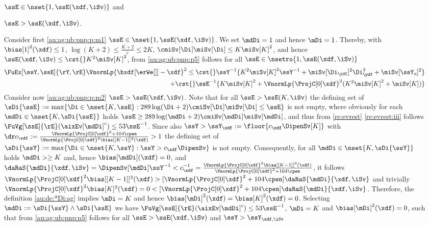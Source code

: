 \begin{pro}
\begin{inparaenum}[i]
$\ssE\in\nset{1,\ssE(\xdf,\iSv)}$ and \item\label{au:ag:ub:pnp:p:m2}
$\ssE>\ssE(\xdf,\iSv)$. \end{inparaenum}
Consider first \ref{au:ag:ub:pnp:p:m1} $\ssE\in\nset{1,\ssE(\xdf,\iSv)}$.
We set $\mdDi=1$ and hence
$\mDi=1$. Thereby, with $\bias[1]^2(\xdf)\leq1$, $\log(K+2)\leq
\tfrac{K+2}{e}\leq 2K$, $\cmiSv[\Di]\miSv[\Di]\leq K\miSv[K]^2$, and hence $\ssE(\xdf,\iSv)\leq\cst{}K^2\miSv[K]^2$,
from \eqref{au:ag:ub:pnp:p5} follows for all $\ssE\in\nsetro{1,\ssE(\xdf,\iSv)}$
\begin{multline}\label{au:ag:ub:pnp:p6}
  \FuEx[\ssY,\ssE]{\rY,\rE}\VnormLp{\hxdf[{\erWe[]}]-\xdf}^2\leq \cst{}\ssY^{-1}\{K^2\miSv[K]^2\ssY^{-1}+\miSv[\Di_{\ydf}]^2\Di_{\ydf}^3+\miSv[\ssY_{o}]^2\}\\\hfill
    +\cst{}\ssE^{-1}\{K\miSv[K]^2+ \VnormLp{\ProjC[0]\xdf}^2(K^2\miSv[K]^2+\miSv[K])\}
  \end{multline}
Consider now \ref{au:ag:ub:pnp:p:m2} $\ssE>\ssE(\xdf,\iSv)$. Note that for all $\ssE> \ssE(K,\iSv)$ the defining set of
$\sDi{\ssE}:=\max\{\Di\in\nset{K,\ssE}:289\log(\Di+2)\cmiSv[\Di]\miSv[\Di]\leq\ssE\}$
is not empty, where obviously for each
$\mdDi\in\nset{K,\sDi{\ssE}}$ holds 
$\ssE\geq289\log(\mdDi+2)\cmiSv[\mdDi]\miSv[\mdDi]$, and thus from
\cref{re:evrest} \ref{re:evrest:iii} follows
$\FuVg[\ssE]{\rE}(\aixEv[\mdDi]^c)\leq 53\ssE^{-1}$.
Since also
$\ssY> \ssY_{\xdf}:=\floor{c_{\xdf}\DipenSv[K]}$ with
$\dr c_{\xdf}:=\tfrac{\VnormLp{\ProjC[0]\xdf}^2+104\cpen}{\VnormLp{\ProjC[0]\xdf}^2\bias[{[K-1]}]^2(\xdf)}>1$
the defining set of
$\sDi{\ssY}:=\max\{\Di\in\nset{K,\ssY}:\ssY>c_{\xdf}\DipenSv\}$ is not
empty. Consequently,  for all $\mdDi\in\nset{K,\sDi{\ssY}}$ holds $\mdDi>\geq
K$ and, hence 
$\bias[\mdDi](\xdf)=0$, and
$\daRaS{\mdDi}{\xdf,\iSv}=\DipenSv[\mdDi]\ssY^{-1}<c_{\xdf}^{-1}=\tfrac{\VnormLp{\ProjC[0]\xdf}^2\bias[{[K-1]}]^2(\xdf)}{\VnormLp{\ProjC[0]\xdf}^2+104\cpen}$,
it follows
$\VnormLp{\ProjC[0]\xdf}^2\bias[{[K-1]}]^2(\xdf)>[\VnormLp{\ProjC[0]\xdf}^2+104\cpen]\daRaS{\mdDi}{\xdf,\iSv}$
and trivially
$\VnormLp{\ProjC[0]\xdf}^2\bias[{K}]^2(\xdf)=0<[\VnormLp{\ProjC[0]\xdf}^2+104\cpen]\daRaS{\mdDi}{\xdf,\iSv}$. Therefore, the definition \eqref{au:de:*Di:ag}
implies $\mDi=K$ and hence
$\bias[\mDi]^2(\xdf)=\bias[K]^2(\xdf)=0$. Selecting
  $\mdDi:=\sDi{\ssY}\wedge\sDi{\ssE}$ we have 
$\FuVg[\ssE]{\rE}(\aixEv[\mdDi]^c)\leq 53\ssE^{-1}$, 
$\mDi=K$ and $\bias[\mDi]^2(\xdf)=0$, such that 
 from  \eqref{au:ag:ub:pnp:p5} follows for all $\ssE>\ssE(\xdf,\iSv)$
 and $\ssY>\ssY_{\xdf,\iSv}$
\begin{multline}\label{au:ag:ub:pnp:p7}

\end{multline}
\end{pro}
